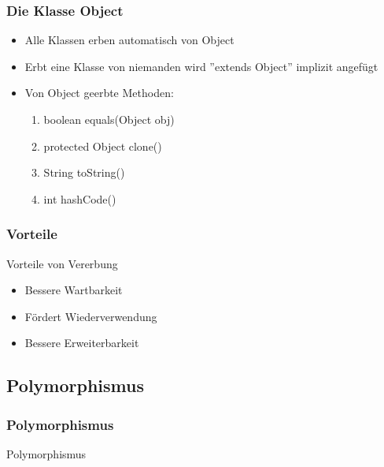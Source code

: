 \begin{frame}[fragile]
	\frametitle{Die Klasse Object}
			\begin{itemize}
			  \item Alle Klassen erben automatisch von Object
			  \item Erbt eine Klasse von niemanden wird ''extends
			  Object'' implizit angef\"ugt
			  \item Von Object geerbte Methoden:
			  \begin{enumerate}
			    \item boolean equals(Object obj)
			    \item protected Object clone()
			    \item String toString()
			    \item int hashCode()
			  \end{enumerate}
		\end{itemize}
\end{frame} 

\begin{frame}[fragile]
	\frametitle{Vorteile}
		\begin{exampleblock}{Vorteile von Vererbung}
			\begin{itemize}
			  \item Bessere Wartbarkeit
			  \item F\"ordert Wiederverwendung
			  \item Bessere Erweiterbarkeit
			\end{itemize}
		\end{exampleblock} 
\end{frame}



\subsection{Polymorphismus}
\begin{frame}[fragile]
	\frametitle{Polymorphismus}
	\huge Polymorphismus
\end{frame}

